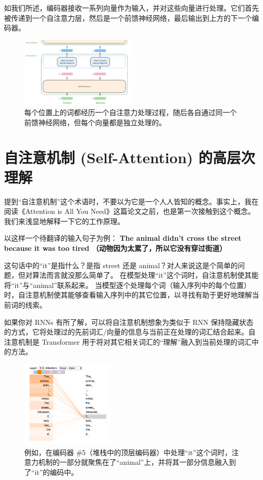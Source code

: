 \documentclass[cn,hazy,blue,10pt,normal]{elegantnote}
\begin{document}
如我们所述，编码器接收一系列向量作为输入，并对这些向量进行处理。它们首先被传递到一个自注意力层，然后是一个前馈神经网络，最后输出到上方的下一个编码器。

\begin{figure}[htbp]
	\centering
	\includegraphics[width=0.5\textwidth]{image/encoder_with_tensors_2.png}
	\caption{每个位置上的词都经历一个自注意力处理过程，随后各自通过同一个前馈神经网络，但每个向量都是独立处理的。
}
\end{figure}

\section{自注意机制 (Self-Attention) 的高层次理解}

提到“自注意机制”这个术语时，不要以为它是一个人人皆知的概念。事实上，我在阅读《Attention is All You Need》这篇论文之前，也是第一次接触到这个概念。我们来浅显地解释一下它的工作原理。

以这样一个待翻译的输入句子为例：
\textbf{The animal didn't cross the street because it was too tired （动物因为太累了，所以它没有穿过街道）}

这句话中的“it”是指什么？是指 street 还是 animal？对人来说这是个简单的问题，但对算法而言就没那么简单了。
在模型处理“it”这个词时，自注意机制使其能将“it”与“animal”联系起来。
当模型逐个处理每个词（输入序列中的每个位置）时，自注意机制使其能够查看输入序列中的其它位置，以寻找有助于更好地理解当前词的线索。

如果你对 RNNs 有所了解，可以将自注意机制想象为类似于 RNN 保持隐藏状态的方式，它将处理过的先前词汇/向量的信息与当前正在处理的词汇结合起来。自注意机制是 Transformer 用于将对其它相关词汇的“理解”融入到当前处理的词汇中的方法。

\begin{figure}[htbp]
	\centering
	\includegraphics[width=0.4\textwidth]{image/transformer_self-attention_visualization.png}
	\caption{例如，在编码器 \#5（堆栈中的顶层编码器）中处理“it”这个词时，注意力机制的一部分就聚焦在了“animal”上，并将其一部分信息融入到了“it”的编码中。
	}
\end{figure}
\end{document}

